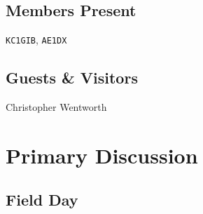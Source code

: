 \documentclass[10pt,letterpaper]{article}
\begin{document}
\subsection{Members Present}
\texttt{KC1GIB}, \texttt{AE1DX}

\subsection{Guests \& Visitors}
Christopher Wentworth

\section{Primary Discussion}

\subsection{Field Day}
\end{document}
